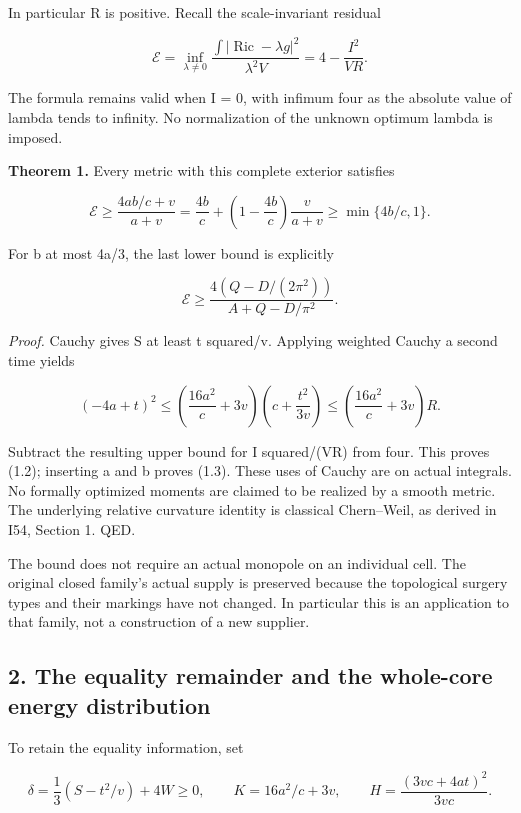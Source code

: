 \documentclass[
  10pt,
]{article}
\begin{document}
In particular R is positive. Recall the scale-invariant residual

\[
 \mathcal E=\inf_{\lambda\ne0}
 \frac{\int|\operatorname{Ric}-\lambda g|^2}{\lambda^2 V}
          =4-\frac{I^2}{VR}.
\]

The formula remains valid when I = 0, with infimum four as the absolute
value of lambda tends to infinity. No normalization of the unknown
optimum lambda is imposed.

\textbf{Theorem 1.} Every metric with this complete exterior satisfies

\[
 \boxed{\mathcal E\ge
 \frac{4ab/c+v}{a+v}
 =\frac{4b}{c}+\left(1-\frac{4b}{c}\right)\frac{v}{a+v}
 \ge\min\{4b/c,1\}.}                                   \tag{1.2}
\]

For b at most 4a/3, the last lower bound is explicitly

\[
 \boxed{\mathcal E\ge
 \frac{4(Q-D/(2\pi^2))}{A+Q-D/\pi^2}.}                  \tag{1.3}
\]

\emph{Proof.} Cauchy gives S at least t squared/v. Applying weighted
Cauchy a second time yields

\[
 (-4a+t)^2\le
 \left(\frac{16a^2}{c}+3v\right)
 \left(c+\frac{t^2}{3v}\right)
 \le\left(\frac{16a^2}{c}+3v\right)R.
\]

Subtract the resulting upper bound for I squared/(VR) from four. This
proves (1.2); inserting a and b proves (1.3). These uses of Cauchy are
on actual integrals. No formally optimized moments are claimed to be
realized by a smooth metric. The underlying relative curvature identity
is classical Chern--Weil, as derived in I54, Section 1. QED.

The bound does not require an actual monopole on an individual cell. The
original closed family's actual supply is preserved because the
topological surgery types and their markings have not changed. In
particular this is an application to that family, not a construction of
a new supplier.

\hypertarget{the-equality-remainder-and-the-whole-core-energy-distribution}{%
\subsection{2. The equality remainder and the whole-core energy
distribution}\label{the-equality-remainder-and-the-whole-core-energy-distribution}}

To retain the equality information, set

\[
 \delta=\frac13(S-t^2/v)+4W\ge0,\qquad
 K=16a^2/c+3v,\qquad H=\frac{(3vc+4at)^2}{3vc}.
\]
\end{document}

